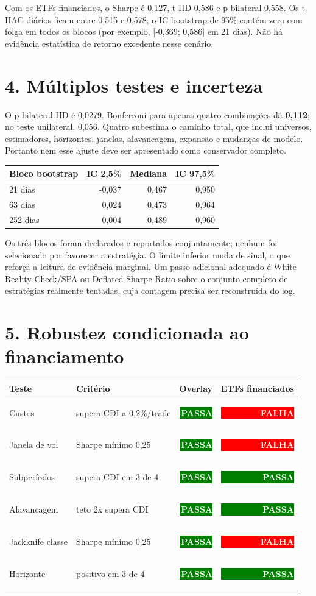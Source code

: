 \documentclass[10pt,a4paper]{article}
\newcommand{\critical}[1]{\colorbox{red}{\textcolor{white}{\strut\textbf{#1}}}}
\newcommand{\ok}[1]{\colorbox{green}{\textcolor{white}{\strut\textbf{#1}}}}
\begin{document}
Com os ETFs financiados, o Sharpe é 0,127, t IID 0,586 e p bilateral 0,558.
Os t HAC diários ficam entre 0,515 e 0,578; o IC bootstrap de 95\% contém zero
com folga em todos os blocos (por exemplo, [-0,369; 0,586] em 21 dias). Não há
evidência estatística de retorno excedente nesse cenário.

\newpage
\section*{4. Múltiplos testes e incerteza}

O p bilateral IID é 0,0279. Bonferroni para apenas quatro combinações dá
\textbf{0,112}; no teste unilateral, 0,056. Quatro subestima o caminho total,
que inclui universos, estimadores, horizontes, janelas, alavancagem, expansão e
mudanças de modelo. Portanto nem esse ajuste deve ser apresentado como
conservador completo.

\begin{tabularx}{\textwidth}{Xrrr}
\toprule
Bloco bootstrap & IC 2,5\% & Mediana & IC 97,5\%\\
\midrule
21 dias & -0,037 & 0,467 & 0,950\\
63 dias & 0,024 & 0,473 & 0,964\\
252 dias & 0,004 & 0,489 & 0,960\\
\bottomrule
\end{tabularx}

Os três blocos foram declarados e reportados conjuntamente; nenhum foi
selecionado por favorecer a estratégia. O limite inferior muda de sinal, o que
reforça a leitura de evidência marginal. Um passo adicional adequado é White
Reality Check/SPA ou Deflated Sharpe Ratio sobre o conjunto completo de
estratégias realmente tentadas, cuja contagem precisa ser reconstruída do log.

\section*{5. Robustez condicionada ao financiamento}
\begin{tabularx}{\textwidth}{l X r r}
\toprule
Teste & Critério & Overlay & ETFs financiados\\
\midrule
Custos & supera CDI a 0,2\%/trade & \ok{PASSA} & \critical{FALHA}\\
Janela de vol & Sharpe mínimo 0,25 & \ok{PASSA} & \critical{FALHA}\\
Subperíodos & supera CDI em 3 de 4 & \ok{PASSA} & \ok{PASSA}\\
Alavancagem & teto 2x supera CDI & \ok{PASSA} & \ok{PASSA}\\
Jackknife classe & Sharpe mínimo 0,25 & \ok{PASSA} & \critical{FALHA}\\
Horizonte & positivo em 3 de 4 & \ok{PASSA} & \ok{PASSA}\\
\bottomrule
\end{tabularx}
\end{document}
